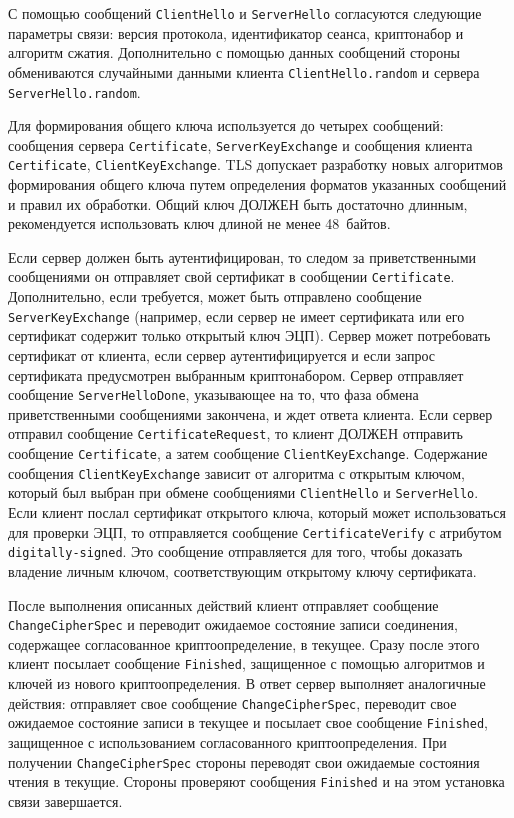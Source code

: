 С помощью сообщений \lstinline{ClientHello} и \lstinline{ServerHello} 
согласуются следующие параметры связи: версия протокола, идентификатор 
сеанса, криптонабор и алгоритм сжатия. Дополнительно с помощью данных 
сообщений стороны обмениваются случайными данными клиента 
\lstinline{ClientHello.random} и сервера \lstinline{ServerHello.random}. 

Для формирования общего ключа используется до четырех сообщений: сообщения 
сервера \lstinline{Certificate}, \lstinline{ServerKeyExchange} и сообщения 
клиента \lstinline{Certificate}, \lstinline{ClientKeyExchange}. TLS 
допускает разработку новых алгоритмов формирования общего ключа путем 
определения форматов указанных сообщений и правил их обработки. Общий ключ 
ДОЛЖЕН быть достаточно длинным, рекомендуется использовать ключ длиной не 
менее 48~байтов.  

Если сервер должен быть аутентифицирован, то следом за приветственными
сообщениями он отправляет свой сертификат в сообщении
\lstinline{Certificate}. Дополнительно, если требуется, может быть
отправлено сообщение \lstinline{ServerKeyExchange} (например, если сервер
не имеет сертификата или его сертификат содержит только открытый ключ ЭЦП).
Сервер может потребовать сертификат от клиента, если сервер
аутентифицируется и если запрос сертификата предусмотрен выбранным
криптонабором. Сервер отправляет сообщение \lstinline{ServerHelloDone},
указывающее на то, что фаза обмена приветственными сообщениями закончена, и
ждет ответа клиента. Если сервер отправил сообщение
\lstinline{CertificateRequest}, то клиент ДОЛЖЕН отправить сообщение
\lstinline{Certificate}, а затем сообщение \lstinline{ClientKeyExchange}.
Содержание сообщения \lstinline{ClientKeyExchange} зависит от алгоритма с
открытым ключом, который был выбран при обмене сообщениями
\lstinline{ClientHello} и \lstinline{ServerHello}. Если клиент послал
сертификат открытого ключа, который может использоваться для проверки ЭЦП,
то отправляется сообщение \lstinline{CertificateVerify} с атрибутом
\lstinline{digitally-signed}. Это сообщение отправляется для того, чтобы
доказать владение личным ключом, соответствующим открытому ключу
сертификата.

После выполнения описанных действий клиент отправляет сообщение
\lstinline{ChangeCipherSpec} и переводит ожидаемое состояние записи
соединения, содержащее согласованное криптоопределение, в текущее. Сразу
после этого клиент посылает сообщение \lstinline{Finished}, защищенное с
помощью алгоритмов и ключей из нового криптоопределения. В ответ сервер
выполняет аналогичные действия: отправляет свое сообщение
\lstinline{ChangeCipherSpec}, переводит свое ожидаемое состояние записи в
текущее и посылает свое сообщение \lstinline{Finished}, защищенное с
использованием согласованного криптоопределения. При получении
\lstinline{ChangeCipherSpec} стороны переводят свои ожидаемые состояния
чтения в текущие. Стороны проверяют сообщения \lstinline{Finished} и на
этом установка связи завершается.

